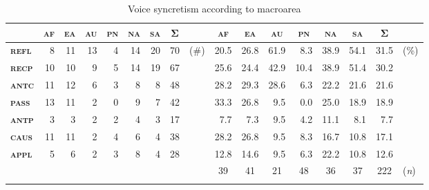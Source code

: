 \begin{table}
	\setlength{\tabcolsep}{2.7pt}
	\begin{tabularx}{.99\textwidth}{lrrrrrrrlrrrrrrrl}
		\lsptoprule
		& \multicolumn{1}{c}{\textbf{\textsc{af}}} & \multicolumn{1}{c}{\textbf{\textsc{ea}}} & \multicolumn{1}{c}{\textbf{\textsc{au}}} & \multicolumn{1}{c}{\textbf{\textsc{pn}}} & \multicolumn{1}{c}{\textbf{\textsc{na}}} & \multicolumn{1}{c}{\textbf{\textsc{sa}}} & \multicolumn{1}{c}{\textbf{Σ}} & & \multicolumn{1}{c}{\textbf{\textsc{af}}} & \multicolumn{1}{c}{\textbf{\textsc{ea}}} & \multicolumn{1}{c}{\textbf{\textsc{au}}} & \multicolumn{1}{c}{\textbf{\textsc{pn}}} & \multicolumn{1}{c}{\textbf{\textsc{na}}} & \multicolumn{1}{c}{\textbf{\textsc{sa}}} & \multicolumn{1}{c}{\textbf{Σ}} & \\
		\midrule
		\textbf{\textsc{refl}} & 8 & 11 & 13 & 4 & 14 & 20 & 70 & (\#) & 20.5 & 26.8 & 61.9 & 8.3 & 38.9 & 54.1 & 31.5 & (\%) \\
		\textbf{\textsc{recp}} & 10 & 10 & 9 & 5 & 14 & 19 & 67 & & 25.6 & 24.4 & 42.9 & 10.4 & 38.9 & 51.4 & 30.2 & \\
		\textbf{\textsc{antc}} & 11 & 12 & 6 & 3 & 8 & 8 & 48 & & 28.2 & 29.3 & 28.6 & 6.3 & 22.2 & 21.6 & 21.6 & \\
		\textbf{\textsc{pass}} & 13 & 11 & 2 & 0 & 9 & 7 & 42 & & 33.3 & 26.8 & 9.5 & 0.0 & 25.0 & 18.9 & 18.9 & \\
		\textbf{\textsc{antp}} & 3 & 3 & 2 & 2 & 4 & 3 & 17 & & 7.7 & 7.3 & 9.5 & 4.2 & 11.1 & 8.1 & 7.7 & \\
		\textbf{\textsc{caus}} & 11 & 11 & 2 & 4 & 6 & 4 & 38 & & 28.2 & 26.8 & 9.5 & 8.3 & 16.7 & 10.8 & 17.1 & \\
		\textbf{\textsc{appl}} & 5 & 6 & 2 & 3 & 8 & 4 & 28 & & 12.8 & 14.6 & 9.5 & 6.3 & 22.2 & 10.8 & 12.6 & \\
		\midrule
		& & & & & & & & & \multicolumn{1}{c}{39} & \multicolumn{1}{c}{41} & \multicolumn{1}{c}{21} & \multicolumn{1}{c}{48} & \multicolumn{1}{c}{36} & \multicolumn{1}{c}{37} & \multicolumn{1}{c}{222} & (\textit{n}) \\
		\lspbottomrule
	\end{tabularx}
	\caption{Voice syncretism according to macroarea}
	\label{tab:ch6:voice-syncretism-macroarea-1}
\end{table} 

